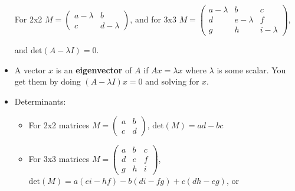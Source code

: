 \documentclass[a4paper]{article}
\begin{document}
\begin{itemize}
            For 2x2 \(M =
                \begin{pmatrix}
                    a-\lambda & b \\
                    c & d-\lambda 
                \end{pmatrix}\), and for 3x3 \( M =
                \begin{pmatrix}
                    a-\lambda & b & c \\
                    d & e-\lambda & f \\
                    g & h & i-\lambda 
                \end{pmatrix} \),
                
            and \( \text{det}(A-\lambda I)=0\).
        \item A vector \(x\) is an \textbf{eigenvector} of \(A\) if \(Ax=\lambda x\) where \(\lambda \) is some scalar. You get them by doing \( (A-\lambda I)x=0\) and solving for \(x\).
        \pagebreak
        \item Determinants:
            \begin{itemize}
                \item For 2x2 matrices 
                    \(M =
                    \begin{pmatrix}
                        a & b \\
                        c & d
                    \end{pmatrix}\),
                    \(\text{det}(M)=ad-bc \)
                \item For 3x3 matrices 
                    \(M =
                    \begin{pmatrix}
                        a & b & c \\
                        d & e & f \\
                        g & h & i
                    \end{pmatrix}\),
                    \(\text{det}(M)= a(ei-hf)-b(di-fg)+c(dh-eg) \), or
                    

\end{itemize}
\end{itemize}
\end{document}
